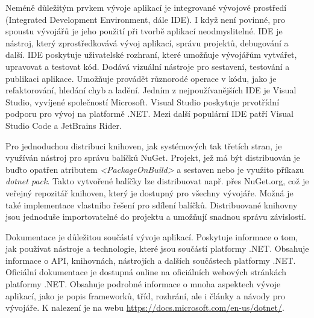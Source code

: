 
Neméně důležitým prvkem vývoje aplikací je integrované vývojové prostředí (Integrated Development Environment, dále IDE). I když není povinné, pro spoustu vývojářů je jeho použití při tvorbě aplikací neodmyslitelné. IDE je nástroj, který zprostředkovává vývoj aplikací, správu projektů, debugování a další. IDE poskytuje uživatelské rozhraní, které umožňuje vývojářům vytvářet, upravovat a testovat kód. Dodává vizuální nástroje pro sestavení, testování a publikaci aplikace. Umožňuje provádět různorodé operace v kódu, jako je refaktorování, hledání chyb a ladění. Jedním z nejpoužívanějších IDE je Visual Studio, vyvíjené společností Microsoft. Visual Studio poskytuje prvotřídní podporu pro vývoj na platformě .NET. Mezi další populární IDE patří Visual Studio Code a JetBrains Rider.


Pro jednoduchou distribuci knihoven, jak systémových tak třetích stran, je využíván nástroj pro správu balíčků NuGet. Projekt, jež má být distribuován je buďto opatřen atributem \emph{<PackageOnBuild>} a sestaven nebo je využito příkazu \emph{dotnet pack}. Takto vytvořené balíčky lze distribuovat např. přes NuGet.org, což je veřejný repozitář knihoven, který je dostupný pro všechny vývojáře. Možná je také implementace vlastního řešení pro sdílení balíčků. Distribuované knihovny jsou jednoduše importovatelné do projektu a umožňují snadnou správu závislostí.


Dokumentace je důležitou součástí vývoje aplikací. Poskytuje informace o tom, jak používat nástroje a technologie, které jsou součástí platformy .NET. Obsahuje informace o API, knihovnách, nástrojích a dalších součástech platformy .NET. Oficiální dokumentace je dostupná online na oficiálních webových stránkách platformy .NET. Obsahuje podrobné informace o mnoha aspektech vývoje aplikací, jako je popis frameworků, tříd, rozhrání, ale i články a návody pro vývojáře. K nalezení je na webu \url{https://docs.microsoft.com/en-us/dotnet/}.


